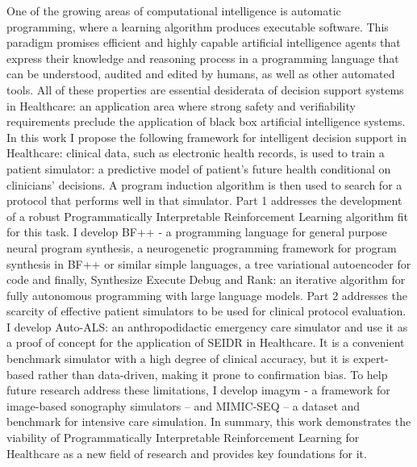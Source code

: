 One of the growing areas of computational intelligence is automatic programming, where a learning algorithm produces executable software. This paradigm promises efficient and highly capable artificial intelligence agents that express their knowledge and reasoning process in a programming language that can be understood, audited and edited by humans, as well as other automated tools. All of these properties are essential desiderata of decision support systems in Healthcare: an application area where strong safety and verifiability requirements preclude the application of black box artificial intelligence systems.
In this work I propose the following framework for intelligent decision support in Healthcare: clinical data, such as electronic health records, is used to train a patient simulator: a predictive model of patient’s future health conditional on clinicians’ decisions. A program induction algorithm is then used to search for a protocol that performs well in that simulator.
Part 1 addresses the development of a robust Programmatically Interpretable Reinforcement Learning algorithm fit for this task.
I develop BF++ - a programming language for general purpose neural program synthesis, a neurogenetic programming framework for program synthesis in BF++ or similar simple languages, a tree variational autoencoder for code and finally, Synthesize Execute Debug and Rank: an iterative algorithm for fully autonomous programming with large language models.
Part 2 addresses the scarcity of effective patient simulators to be used for clinical protocol evaluation. I develop Auto-ALS: an anthropodidactic emergency care simulator and use it as a proof of concept for the application of SEIDR in Healthcare.
It is a convenient benchmark simulator with a high degree of clinical accuracy, but it is expert-based rather than data-driven, making it prone to confirmation bias. To help future research address these limitations, I develop imagym - a framework for image-based sonography simulators – and MIMIC-SEQ – a dataset and benchmark for intensive care simulation. In summary, this work demonstrates the viability of Programmatically Interpretable Reinforcement Learning for Healthcare as a new field of research and provides key foundations for it.